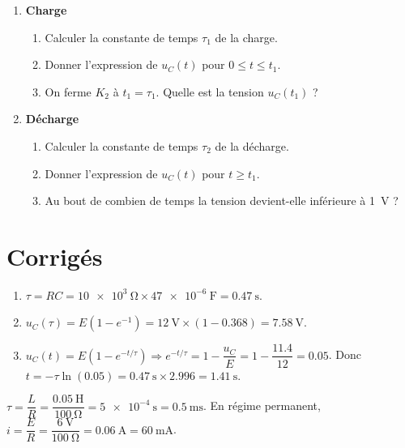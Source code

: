 \begin{enumerate}[label=\arabic*)]
  \item \textbf{Charge}
  \begin{enumerate}[label=\alph*)]
    \item Calculer la constante de temps $\tau_1$ de la charge.
    \item Donner l’expression de $u_C(t)$ pour $0 \le t \le t_1$.
    \item On ferme $K_2$ à $t_1 = \tau_1$. Quelle est la tension $u_C(t_1)$ ?
  \end{enumerate}
  \item \textbf{Décharge}
  \begin{enumerate}[label=\alph*)]
    \item Calculer la constante de temps $\tau_2$ de la décharge.
    \item Donner l’expression de $u_C(t)$ pour $t \ge t_1$.
    \item Au bout de combien de temps la tension devient-elle inférieure à \SI{1}{\volt} ?
  \end{enumerate}
\end{enumerate}

\section{Corrigés}

\begin{enumerate}[label=\alph*)]
  \item $\tau = RC = \SI{10e3}{\ohm} \times \SI{47e-6}{\farad} = \SI{0.47}{\second}$.
  \item $u_C(\tau) = E(1 - e^{-1}) = \SI{12}{\volt} \times (1 - 0.368) = \SI{7.58}{\volt}$.
  \item $u_C(t) = E(1 - e^{-t/\tau}) \Rightarrow e^{-t/\tau} = 1 - \dfrac{u_C}{E} = 1 - \dfrac{11.4}{12} = 0.05$. Donc $t = -\tau \ln(0.05) = \SI{0.47}{\second} \times 2.996 = \SI{1.41}{\second}$.
\end{enumerate}

$\tau = \dfrac{L}{R} = \dfrac{\SI{0.05}{\henry}}{\SI{100}{\ohm}} = \SI{5e-4}{\second} = \SI{0.5}{\milli\second}$. En régime permanent, $i = \dfrac{E}{R} = \dfrac{\SI{6}{\volt}}{\SI{100}{\ohm}} = \SI{0.06}{\ampere} = \SI{60}{\milli\ampere}$.

